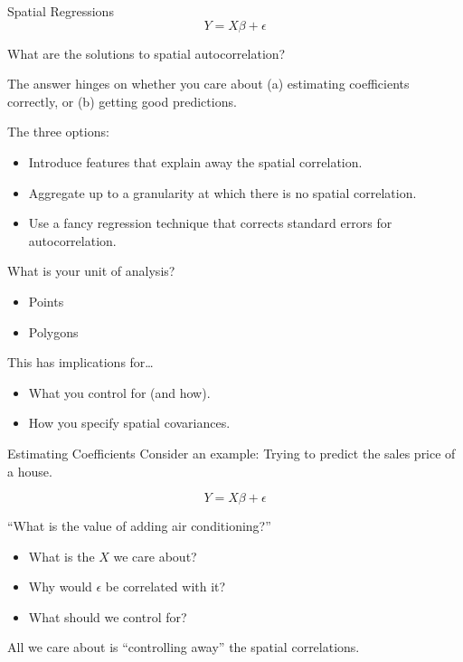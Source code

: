 \documentclass[
  8pt,
  ignorenonframetext,
]{beamer}
\providecommand{\tightlist}{%
  \setlength{\itemsep}{0pt}\setlength{\parskip}{0pt}}
\begin{document}
\begin{frame}{Spatial Regressions}
\protect\hypertarget{spatial-regressions-2}{}
\[Y = X\beta + \epsilon\]

What are the solutions to spatial autocorrelation?

The answer hinges on whether you care about (a) estimating coefficients
correctly, or (b) getting good predictions.

The three options:

\begin{itemize}
\tightlist
\item
  Introduce features that explain away the spatial correlation.
\item
  Aggregate up to a granularity at which there is no spatial
  correlation.
\item
  Use a fancy regression technique that corrects standard errors for
  autocorrelation.
\end{itemize}
\end{frame}

\begin{frame}{What is your unit of analysis?}
\protect\hypertarget{what-is-your-unit-of-analysis}{}
\begin{itemize}
\tightlist
\item
  Points
\item
  Polygons
\end{itemize}

\pause

This has implications for\ldots{}

\begin{itemize}
\tightlist
\item
  What you control for (and how).
\item
  How you specify spatial covariances.
\end{itemize}
\end{frame}

\begin{frame}{Estimating Coefficients}
\protect\hypertarget{estimating-coefficients}{}
Consider an example: Trying to predict the sales price of a house.

\[Y = X\beta + \epsilon\]

``What is the value of adding air conditioning?''

\begin{itemize}
\tightlist
\item
  What is the \(X\) we care about?
\item
  Why would \(\epsilon\) be correlated with it?
\item
  What should we control for?
\end{itemize}

\pause

All we care about is ``controlling away'' the spatial correlations.
\end{frame}
\end{document}
